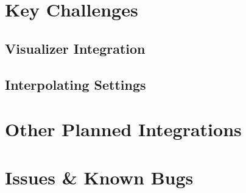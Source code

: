 
\section{Key Challenges}
\subsection{Visualizer Integration}
\paragraph{}
\subsection{Interpolating Settings}
\paragraph{}


\section{Other Planned Integrations}

\section{Issues \& Known Bugs}

